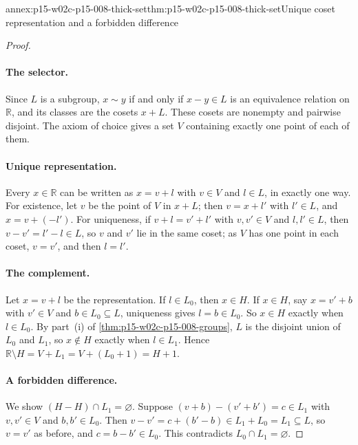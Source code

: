 \begin{annexitem}{annex:p15-w02c-p15-008-thick-set}{thm:p15-w02c-p15-008-thick-set}{Unique coset representation and a forbidden difference}
\begin{proof}
\paragraph{The selector.}
Since \(L\) is a subgroup, \(x\sim y\) if and only if \(x-y\in L\) is an
equivalence relation on \(\mathbb R\), and its classes are the cosets
\(x+L\). These cosets are nonempty and pairwise disjoint. The axiom of
choice gives a set \(V\) containing exactly one point of each of them.

\paragraph{Unique representation.}
Every \(x\in\mathbb R\) can be written as \(x=v+l\) with \(v\in V\) and
\(l\in L\), in exactly one way. For existence, let \(v\) be the point of
\(V\) in \(x+L\); then \(v=x+l'\) with \(l'\in L\), and \(x=v+(-l')\).
For uniqueness, if \(v+l=v'+l'\) with \(v,v'\in V\) and \(l,l'\in L\),
then \(v-v'=l'-l\in L\), so \(v\) and \(v'\) lie in the same coset; as
\(V\) has one point in each coset, \(v=v'\), and then \(l=l'\).

\paragraph{The complement.}
Let \(x=v+l\) be the representation. If \(l\in L_0\), then \(x\in H\).
If \(x\in H\), say \(x=v'+b\) with \(v'\in V\) and \(b\in L_0\subseteq L\),
uniqueness gives \(l=b\in L_0\). So \(x\in H\) exactly when \(l\in L_0\).
By part~(i) of \cref{thm:p15-w02c-p15-008-groups}, \(L\) is the disjoint
union of \(L_0\) and \(L_1\), so \(x\notin H\) exactly when \(l\in L_1\).
Hence \(\mathbb R\setminus H=V+L_1=V+(L_0+1)=H+1\).

\paragraph{A forbidden difference.}
We show \((H-H)\cap L_1=\varnothing\). Suppose
\((v+b)-(v'+b')=c\in L_1\) with \(v,v'\in V\) and \(b,b'\in L_0\). Then
\(v-v'=c+(b'-b)\in L_1+L_0=L_1\subseteq L\), so \(v=v'\) as before, and
\(c=b-b'\in L_0\). This contradicts \(L_0\cap L_1=\varnothing\).


\end{proof}
\end{annexitem}
